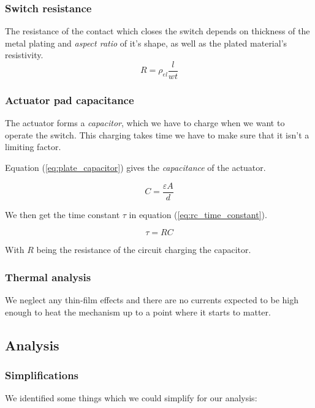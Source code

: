 \subsubsection{Switch resistance}
The resistance of the contact which closes the switch depends on thickness of the metal plating and \emph{aspect ratio} of it's shape, as well as the plated material's resistivity.
\begin{equation}
	R = \rho_{el}\frac{l}{wt}
	\label{eq:resistance}
\end{equation}

\subsubsection{Actuator pad capacitance}
The actuator forms a \emph{capacitor}, which we have to charge when we want to operate the switch.
This charging takes time we have to make sure that it isn't a limiting factor.

Equation (\ref{eq:plate_capacitor}) gives the \emph{capacitance} of the actuator.

\begin{equation}
	C = \frac{\varepsilon A}{d}
	\label{eq:plate_capacitor}
\end{equation}

We then get the time constant $\tau$ in equation (\ref{eq:rc_time_constant}).

\begin{equation}
    \tau = RC
    \label{eq:rc_time_constant}
\end{equation}

With $R$ being the resistance of the circuit charging the capacitor.

\subsubsection{Thermal analysis}

We neglect any thin-film effects and there are no currents expected to be high enough to heat the mechanism up to a point where it starts to matter.


\subsection{Analysis}
\label{sec:analysis}

\subsubsection{Simplifications}
\label{ssub:simplifications}
We identified some things which we could simplify for our analysis:


